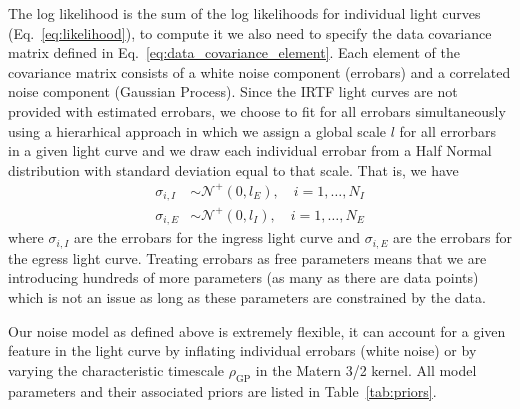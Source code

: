 \documentclass[modern]{aastex62}
\begin{document}
The log likelihood is the sum of the log likelihoods for individual light curves (Eq.~\ref{eq:likelihood}), to compute it we also need to specify the data covariance matrix defined in Eq.~\ref{eq:data_covariance_element}.
Each element of the covariance matrix consists of a white noise component (errobars) and a correlated noise component (Gaussian Process).
Since the IRTF light curves are not provided with estimated errobars, we choose to fit for all errobars simultaneously using a hierarhical approach in which we assign a global scale $l$ for all errorbars in a given light curve and we draw each individual errobar from a Half Normal distribution with standard deviation equal to that scale.
That is, we have 
\begin{align}
    \sigma_{i,I}&\sim \mathcal{N}^+(0, l_E),\quad i=1,\dots,N_I\\
    \sigma_{i,E}&\sim \mathcal{N}^+(0,l_I),\quad i=1,\dots, N_E
\end{align}
where $\sigma_{i,I}$ are the errobars for the ingress light curve and $\sigma_{i,E}$ are the errobars for the egress light curve.
Treating errobars as free parameters means that we are introducing hundreds of more parameters (as many as there are data points) which is not an issue as long as these parameters are constrained by the data.

Our noise model as defined above is extremely flexible, it can account for a given feature in the light curve by inflating individual errobars (white noise) or by varying the characteristic timescale $\rho_\mathrm{GP}$ in the Matern 3/2 kernel.
All model parameters and their associated priors are listed in Table~\ref{tab:priors}. 
\end{document}
